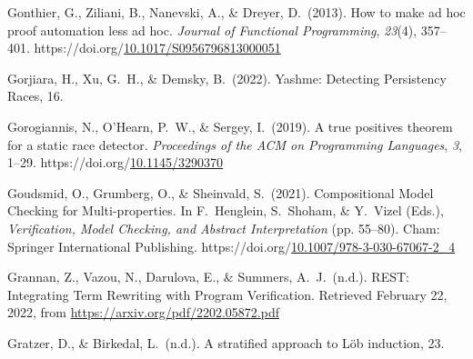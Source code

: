 \documentclass[12pt,twoside]{article}
\begin{document}
{\begin{thebibliography}{1079}
\mdbibitemlabel{}Gonthier, G., Ziliani, B., Nanevski, A., \& Dreyer, D.~(2013). How to make ad hoc proof automation less ad hoc. \emph{Journal of Functional Programming}, \emph{23}(4), 357–401. https://doi.org/\href{https://dx.doi.org/10.1017/S0956796813000051}{10.1017/S0956796813000051}%

\mdbibitemlabel{}Gorjiara, H., Xu, G.~H., \& Demsky, B.~(2022). Yashme: Detecting Persistency Races, 16.%

\mdbibitemlabel{}Gorogiannis, N., O’Hearn, P.~W., \& Sergey, I.~(2019). A true positives theorem for a static race detector. \emph{Proceedings of the ACM on Programming Languages}, \emph{3}, 1–29. https://doi.org/\href{https://dx.doi.org/10.1145/3290370}{10.1145/3290370}%

\mdbibitemlabel{}Goudsmid, O., Grumberg, O., \& Sheinvald, S.~(2021). Compositional Model Checking for Multi-properties. In F.~Henglein, S.~Shoham, \& Y.~Vizel (Eds.), \emph{Verification, Model Checking, and Abstract Interpretation} (pp. 55–80). Cham: Springer International Publishing. https://doi.org/\href{https://dx.doi.org/10.1007/978-3-030-67067-2_4}{10.1007/978-3-030-67067-2\_4}%

\mdbibitemlabel{}Grannan, Z., Vazou, N., Darulova, E., \& Summers, A.~J.~(n.d.). REST: Integrating Term Rewriting with Program Verification. Retrieved February 22, 2022, from \href{https://arxiv.org/pdf/2202.05872.pdf}{{\ttfamily https://\hspace{0pt}arxiv.\hspace{0pt}org/\hspace{0pt}pdf/\hspace{0pt}2202.\hspace{0pt}05872.\hspace{0pt}pdf}}%

\mdbibitemlabel{}Gratzer, D., \& Birkedal, L.~(n.d.). A stratified approach to Löb induction, 23.%


\end{thebibliography}}
\end{document}

